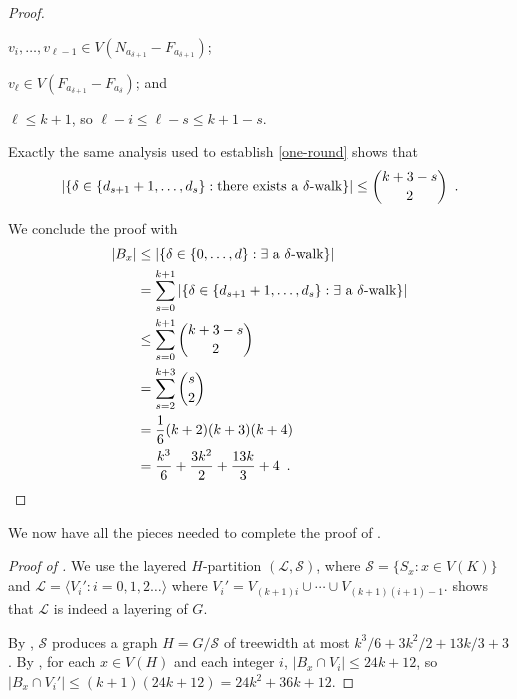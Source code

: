 \documentclass{patmorin}
\newcommand{\treewidth}{\ensuremath{k^3/6 + 3k^2/2 + 13k/3 + 3}}
\begin{document}
\begin{proof}
\begin{compactenum}[(i)]
    \item $v_i,\ldots,v_{\ell-1}\in V(N_{a_{\delta+1}}-F_{a_{\delta+1}})$;
    
    \item $v_\ell\in V(F_{a_{\delta+1}}-F_{a_\delta})$; and
    
    \item $\ell\le k+1$, so $\ell-i \le \ell-s \le k+1-s$.
  \end{compactenum}
  Exactly the same analysis used to establish \eqref{one-round} shows that
  \begin{equation}
     |\{\delta\in\{d_{s+1}+1,\ldots,d_s\}:  \mbox{there exists a $\delta$-walk} \}| \le \binom{k+3-s}{2} \enspace . \eqlabel{one-round-s}
  \end{equation}

  We conclude the proof with 
  \begin{align*}
    |B_x| & \le |\{\delta\in\{0,\ldots,d\}:  \mbox{$\exists$ a $\delta$-walk} \}| \\
      & = \sum_{s=0}^{k+1}|\{\delta\in\{d_{s+1}+1,\ldots,d_s\}:  \mbox{$\exists$ a $\delta$-walk} \}| \\
      & \le\sum_{s=0}^{k+1} \binom{k+3-s}{2} \\
      & = \sum_{s=2}^{k+3} \binom{s}{2} \\
      & = \frac{1}{6}(k+2)(k+3)(k+4) \\
      & = \frac{k^3}{6} + \frac{3k^2}{2} + \frac{13k}{3} + 4  \enspace . \qedhere
  \end{align*}
\end{proof}

We now have all the pieces needed to complete the proof of .

\begin{proof}[Proof of ]
  We use the layered $H$-partition $(\mathcal{L}, \mathcal{S})$, where $\mathcal{S}=\{S_x:x\in V(K)\}$ and $\mathcal{L}=\langle V_i': i=0,1,2\ldots\rangle$ where $V_i' = V_{(k+1)i}\cup\cdots\cup V_{(k+1)(i+1)-1}$.   shows that $\mathcal{L}$ is indeed a layering of $G$.

  By , $\mathcal{S}$ produces a graph $H=G/\mathcal{S}$ of treewidth at most $\treewidth$.  By , for each $x\in V(H)$ and each integer $i$, $|B_x\cap V_i|\le 24k+12$, so $|B_x\cap V_i'|\le (k+1)(24k + 12) = 24k^2+36k+12$. 
\end{proof}
\end{document}
